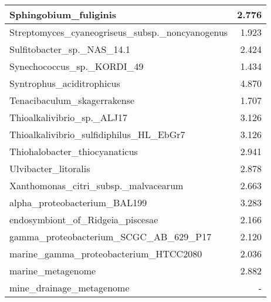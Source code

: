 \documentclass[12pt,a4paper]{article}
\begin{document}
\begin{table}[ht]
\begin{center}
\begin{tabular}{|l*{1}{|r}|}
Sphingobium\_fuliginis & 2.776 \\ \hline
Streptomyces\_cyaneogriseus\_subsp.\_noncyanogenus & 1.923 \\ \hline
Sulfitobacter\_sp.\_NAS\_14.1 & 2.424 \\ \hline
Synechococcus\_sp.\_KORDI\_49 & 1.434 \\ \hline
Syntrophus\_aciditrophicus & 4.870 \\ \hline
Tenacibaculum\_skagerrakense & 1.707 \\ \hline
Thioalkalivibrio\_sp.\_ALJ17 & 3.126 \\ \hline
Thioalkalivibrio\_sulfidiphilus\_HL\_EbGr7 & 3.126 \\ \hline
Thiohalobacter\_thiocyanaticus & 2.941 \\ \hline
Ulvibacter\_litoralis & 2.878 \\ \hline
Xanthomonas\_citri\_subsp.\_malvacearum & 2.663 \\ \hline
alpha\_proteobacterium\_BAL199 & 3.283 \\ \hline
endosymbiont\_of\_Ridgeia\_piscesae & 2.166 \\ \hline
gamma\_proteobacterium\_SCGC\_AB\_629\_P17 & 2.120 \\ \hline
marine\_gamma\_proteobacterium\_HTCC2080 & 2.036 \\ \hline
marine\_metagenome & 2.882 \\ \hline
mine\_drainage\_metagenome & - \\ \hline
\end{tabular}
\end{center}
\end{table}
\end{document}
